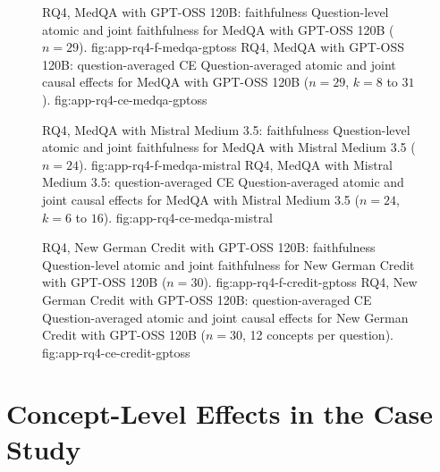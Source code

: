 \begin{figure}[H]
  \centering
    {RQ4, MedQA with GPT-OSS 120B: faithfulness}%
    {Question-level atomic and joint faithfulness for MedQA with GPT-OSS 120B ($n=29$).}%
    {fig:app-rq4-f-medqa-gptoss}%
  \hfill
    {RQ4, MedQA with GPT-OSS 120B: question-averaged CE}%
    {Question-averaged atomic and joint causal effects for MedQA with GPT-OSS 120B ($n=29$, $k=8$ to $31$).}%
    {fig:app-rq4-ce-medqa-gptoss}%
\end{figure}

\begin{figure}[H]
  \centering
    {RQ4, MedQA with Mistral Medium 3.5: faithfulness}%
    {Question-level atomic and joint faithfulness for MedQA with Mistral Medium 3.5 ($n=24$).}%
    {fig:app-rq4-f-medqa-mistral}%
  \hfill
    {RQ4, MedQA with Mistral Medium 3.5: question-averaged CE}%
    {Question-averaged atomic and joint causal effects for MedQA with Mistral Medium 3.5 ($n=24$, $k=6$ to $16$).}%
    {fig:app-rq4-ce-medqa-mistral}%
\end{figure}

\begin{figure}[H]
  \centering
    {RQ4, New German Credit with GPT-OSS 120B: faithfulness}%
    {Question-level atomic and joint faithfulness for New German Credit with GPT-OSS 120B ($n=30$).}%
    {fig:app-rq4-f-credit-gptoss}%
  \hfill
    {RQ4, New German Credit with GPT-OSS 120B: question-averaged CE}%
    {Question-averaged atomic and joint causal effects for New German Credit with GPT-OSS 120B ($n=30$, 12 concepts per question).}%
    {fig:app-rq4-ce-credit-gptoss}%
\end{figure}

\section{Concept-Level Effects in the Case Study}
\label{app:case-study-identity}

